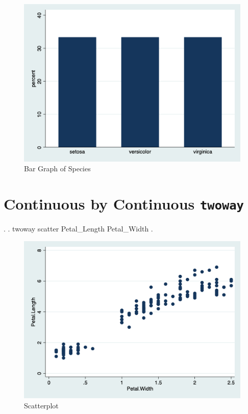 \documentclass[]{article}
\begin{document}
\begin{stlog}


{\smallskip}

\end{stlog}

\begin{figure}
\centering
\includegraphics[width=0.75\linewidth]{mybargraph.png}
\caption{Bar Graph of Species}
\end{figure}

\hypertarget{continuous-by-continuous-twoway}{%
\section{\texorpdfstring{Continuous by Continuous
\texttt{twoway}}{Continuous by Continuous twoway}}\label{continuous-by-continuous-twoway}}

\begin{stlog}
. 
. twoway scatter Petal_Length Petal_Width
{\smallskip}
. 
\end{stlog}

\begin{stlog}


{\smallskip}

\end{stlog}

\begin{figure}
\centering
\includegraphics[width=0.75\linewidth]{myscatter.png}
\caption{Scatterplot}
\end{figure}
\end{document}
